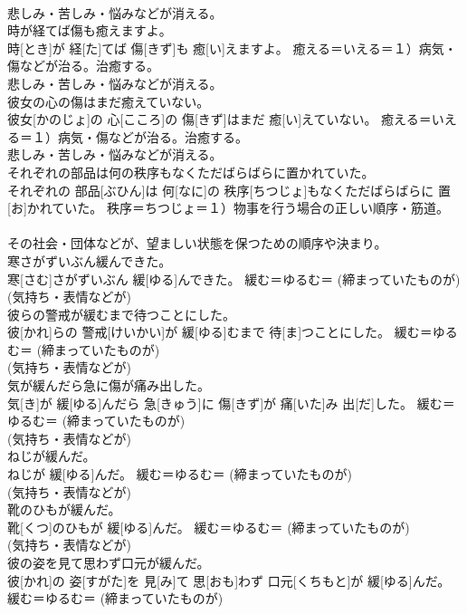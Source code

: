 \documentclass[8pt]{extreport}
\begin{document}
\begin{CJK}{UTF8}{min}
{\\	悲しみ・苦しみ・悩みなどが消える。
\\	時が経てば傷も癒えますよ。	
\\	時[とき]が 経[た]てば 傷[きず]も 癒[い]えますよ。	癒える＝いえる＝１）病気・傷などが治る。治癒する。 　　　　　　　　
\\	悲しみ・苦しみ・悩みなどが消える。
\\	彼女の心の傷はまだ癒えていない。	
\\	彼女[かのじょ]の 心[こころ]の 傷[きず]はまだ 癒[い]えていない。	癒える＝いえる＝１）病気・傷などが治る。治癒する。 　　　　　　　　
\\	悲しみ・苦しみ・悩みなどが消える。
\\	それぞれの部品は何の秩序もなくただばらばらに置かれていた。	
\\	それぞれの 部品[ぶひん]は 何[なに]の 秩序[ちつじょ]もなくただばらばらに 置[お]かれていた。	秩序＝ちつじょ＝１）物事を行う場合の正しい順序・筋道。 　　　　　　　　
\\	その社会・団体などが、望ましい状態を保つための順序や決まり。
\\	寒さがずいぶん緩んできた。	
\\	寒[さむ]さがずいぶん 緩[ゆる]んできた。	緩む＝ゆるむ＝ (締まっていたものが) 
\\	(気持ち・表情などが) 
\\	彼らの警戒が緩むまで待つことにした。	
\\	彼[かれ]らの 警戒[けいかい]が 緩[ゆる]むまで 待[ま]つことにした。	緩む＝ゆるむ＝ (締まっていたものが) 
\\	(気持ち・表情などが) 
\\	気が緩んだら急に傷が痛み出した。	
\\	気[き]が 緩[ゆる]んだら 急[きゅう]に 傷[きず]が 痛[いた]み 出[だ]した。	緩む＝ゆるむ＝ (締まっていたものが) 
\\	(気持ち・表情などが) 
\\	ねじが緩んだ。	
\\	ねじが 緩[ゆる]んだ。	緩む＝ゆるむ＝ (締まっていたものが) 
\\	(気持ち・表情などが) 
\\	靴のひもが緩んだ。	
\\	靴[くつ]のひもが 緩[ゆる]んだ。	緩む＝ゆるむ＝ (締まっていたものが) 
\\	(気持ち・表情などが) 
\\	彼の姿を見て思わず口元が緩んだ。	
\\	彼[かれ]の 姿[すがた]を 見[み]て 思[おも]わず 口元[くちもと]が 緩[ゆる]んだ。	緩む＝ゆるむ＝ (締まっていたものが) 
}
\end{CJK}
\end{document}
